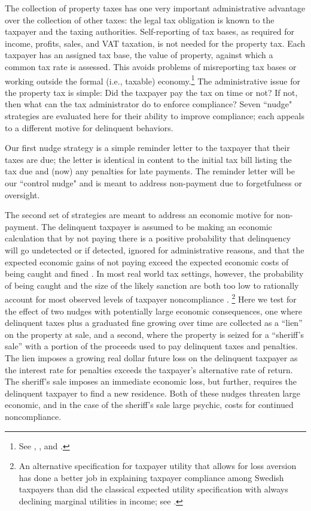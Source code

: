 \documentclass[12pt]{article}
\begin{document}
The collection of property taxes has one very important administrative
advantage over the collection of other taxes: the legal tax obligation
is known to the taxpayer and the taxing authorities.  Self-reporting
of tax bases, as required for income, profits, sales, and VAT
taxation, is not needed for the property tax. Each taxpayer has an
assigned tax base, the value of property, against which a common tax
rate is assessed.  This avoids problems of misreporting tax bases or
working outside the formal (i.e., taxable) economy.\footnote{See
  , , and .}
The administrative issue for the property tax is simple: Did the
taxpayer pay the tax on time or not?  If not, then what can the tax
administrator do to enforce compliance?  Seven ``nudge" strategies are
evaluated here for their ability to improve compliance; each appeals
to a different motive for delinquent behaviors.

Our first nudge strategy is a simple reminder letter to the taxpayer
that their taxes are due; the letter is identical in content to the
initial tax bill listing the tax due and (now) any penalties for late
payments.  The reminder letter will be our ``control nudge" and is
meant to address non-payment due to forgetfulness or oversight.

The second set of strategies are meant to address an economic motive
for non-payment.  The delinquent taxpayer is assumed to be making an
economic calculation that by not paying there is a positive
probability that delinquency will go undetected or if detected,
ignored for administrative reasons, and that the expected economic
gains of not paying exceed the expected economic costs of being caught
and fined \cite{Allingham-Sandmo-72}.  In most real world tax
settings, however, the probability of being caught and the size of the
likely sanction are both too low to rationally account for most
observed levels of taxpayer noncompliance \cite{Alm-92}. \footnote{An
  alternative specification for taxpayer utility that allows for loss
  aversion has done a better job in explaining taxpayer compliance
  among Swedish taxpayers than did the classical expected utility
  specification with always declining marginal utilities in income;
  see . } Here we test for the effect of two nudges
with potentially large economic consequences, one where delinquent
taxes plus a graduated fine growing over time are collected as a
``lien'' on the property at sale, and a second, where the property
is seized for a ``sheriff's sale'' with a portion of the
proceeds used to pay delinquent taxes and penalties. The lien imposes
a growing real dollar future loss on the delinquent taxpayer as the
interest rate for penalties exceeds the taxpayer's alternative rate
of return. The sheriff's sale imposes an immediate economic loss,
but further, requires the delinquent taxpayer to find a new residence.
Both of these nudges threaten large economic, and in the case of the
sheriff's sale large psychic, costs for continued noncompliance.
\end{document}
